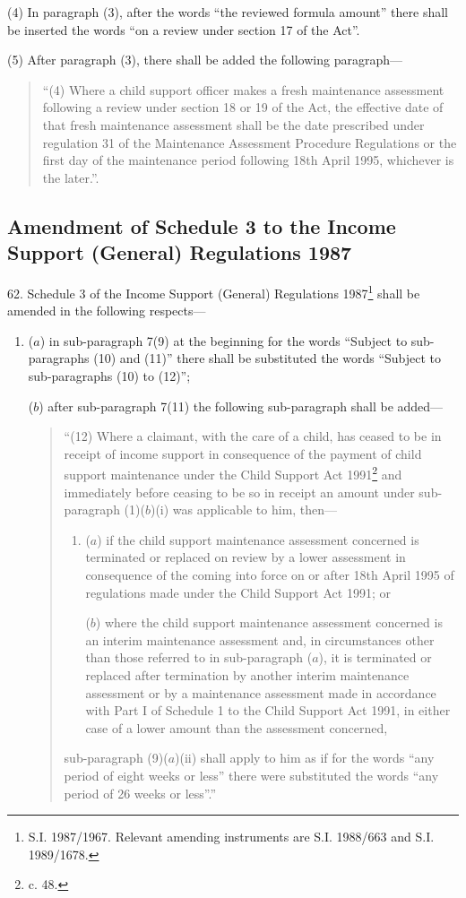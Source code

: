 \documentclass[a4paper]{article}
\begin{document}
(4) In paragraph (3), after the words “the reviewed formula amount” there shall be inserted the words “on a review under section 17 of the Act”.

(5) After paragraph (3), there shall be added the following paragraph—
\begin{quotation}
“(4) Where a child support officer makes a fresh maintenance assessment following a review under section 18 or 19 of the Act, the effective date of that fresh maintenance assessment shall be the date prescribed under regulation 31 of the Maintenance Assessment Procedure Regulations or the first day of the maintenance period following 18th April 1995, whichever is the later.”.
\end{quotation}

\subsection[62. Amendment of Schedule 3 to the Income Support (General) Regulations 1987]{\sloppy Amendment of Schedule 3 to the Income Support (General) Regulations 1987}

62.  Schedule 3 of the Income Support (General) Regulations 1987\footnote{\frenchspacing S.I. 1987/1967. Relevant amending instruments are S.I. 1988/663 and S.I. 1989/1678.} shall be amended in the following respects—
\begin{enumerate}\item[]
($a$) in sub-paragraph 7(9) at the beginning for the words “Subject to sub-paragraphs (10) and (11)” there shall be substituted the words “Subject to sub-paragraphs (10) to (12)”;

($b$) after sub-paragraph 7(11) the following sub-paragraph shall be added—
\begin{quotation}
“(12) Where a claimant, with the care of a child, has ceased to be in receipt of income support in consequence of the payment of child support maintenance under the Child Support Act 1991\footnote{ c. 48.} and immediately before ceasing to be so in receipt an amount under sub-paragraph (1)($b$)(i) was applicable to him, then—
\begin{enumerate}\item[]
($a$) if the child support maintenance assessment concerned is terminated or replaced on review by a lower assessment in consequence of the coming into force on or after 18th April 1995 of regulations made under the Child Support Act 1991; or

($b$) where the child support maintenance assessment concerned is an interim maintenance assessment and, in circumstances other than those referred to in sub-paragraph ($a$), it is terminated or replaced after termination by another interim maintenance assessment or by a maintenance assessment made in accordance with Part I of Schedule 1 to the Child Support Act 1991, in either case of a lower amount than the assessment concerned,
\end{enumerate}
sub-paragraph (9)($a$)(ii) shall apply to him as if for the words “any period of eight weeks or less” there were substituted the words “any period of 26 weeks or less”.”
\end{quotation}
\end{enumerate}
\end{document}
